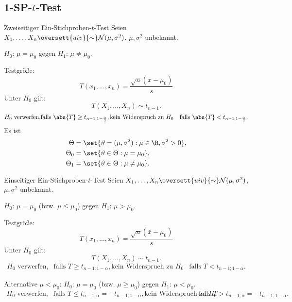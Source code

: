 \subsection{1-SP-\(t\)-Test}

\begin{karte}{Zweiseitiger Ein-Stichproben-\(t\)-Test}
Seien \(X_1, \ldots, X_n \oversett{uiv}{\sim} \mathcal{N}(\mu, \sigma^2)\), \(\mu, \sigma^2\) unbekannt.

\(H_0\): \(\mu = \mu_0\) gegen \(H_1\): \(\mu \neq \mu_0\).

Testgröße: 
\[ T(x_1, \ldots, x_n) = \frac{\sqrt{n} (\bar{x} - \mu_0)}{s} \]
Unter \(H_0\) gilt: 
\[ T(X_1, \ldots, X_n) \sim t_{n-1}. \]
\begin{align*}
    H_0 \text{ verwerfen,} & \text{falls } \abs{T} \geq t_{n-1;1-\frac{\alpha}{2}},
    \text{kein Widerspruch zu } H_0 & \text{falls } \abs{T} < t_{n-1;1-\frac{\alpha}{2}}.
\end{align*}
Es ist \begin{align*}
    \Theta &= \set{\vartheta = (\mu, \sigma^2): \mu \in \R, \sigma^2 > 0}, \\
    \Theta_0 &= \set{\vartheta \in \Theta: \mu = \mu_0}, \\
    \Theta_1 &= \set{\vartheta \in \Theta: \mu \neq \mu_0}.
\end{align*}
\end{karte}

\begin{karte}{Einseitiger Ein-Stichproben-\(t\)-Test}
    Seien \(X_1, \ldots, X_n \oversett{uiv}{\sim} \mathcal{N}(\mu, \sigma^2)\), \(\mu, \sigma^2\) unbekannt.
    
    \(H_0\): \(\mu = \mu_0\) (bzw. \(\mu \leq \mu_0\)) gegen \(H_1\): \(\mu > \mu_0\).
    
    Testgröße: 
    \[ T(x_1, \ldots, x_n) = \frac{\sqrt{n} (\bar{x} - \mu_0)}{s} \]
    Unter \(H_0\) gilt: 
    \[ T(X_1, \ldots, X_n) \sim t_{n-1}. \]
    \begin{align*}
        H_0 \text{ verwerfen,} & \text{falls } T \geq t_{n-1;1-\alpha},
        \text{kein Widerspruch zu } H_0 & \text{falls } T < t_{n-1;1-\alpha}.
    \end{align*}
    
    Alternative \( \mu < \mu_0 \):
    \(H_0\): \(\mu = \mu_0\) (bzw. \(\mu \geq \mu_0\)) gegen \(H_1\): \(\mu < \mu_0\).
    \begin{align*}
        H_0 \text{ verwerfen,} & \text{falls } T \leq t_{n-1;\alpha} = -t_{n-1;1-\alpha},
        \text{kein Widerspruch zu } H_0 & \text{falls } T > t_{n-1;\alpha} = -t_{n-1;1-\alpha}.
    \end{align*}
\end{karte}

